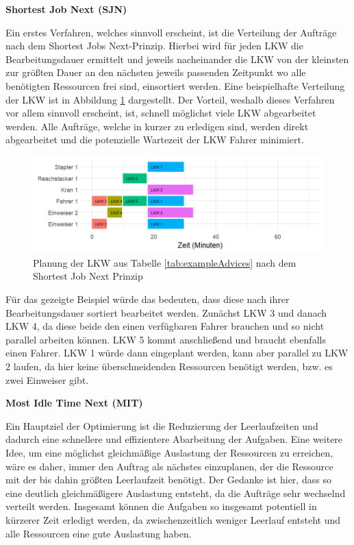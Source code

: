 \textbf{Shortest Job Next (SJN)}

Ein erstes Verfahren, welches sinnvoll erscheint, ist die Verteilung der Aufträge nach dem \glqq{}Shortest Jobs Next\grqq{}-Prinzip. Hierbei wird für jeden LKW die Bearbeitungsdauer ermittelt und jeweils nacheinander die LKW von der kleinsten zur größten Dauer an den nächsten jeweils passenden Zeitpunkt wo alle benötigten Ressourcen frei sind, einsortiert werden. Eine beispielhafte Verteilung der LKW ist in Abbildung \ref{fig:rsSjnExample} dargestellt. Der Vorteil, weshalb dieses Verfahren vor allem sinnvoll erscheint, ist, schnell möglichst viele LKW abgearbeitet werden. Alle Aufträge, welche in kurzer zu erledigen sind, werden direkt abgearbeitet und die potenzielle Wartezeit der LKW Fahrer minimiert.

\begin{figure}[H]
    \centering
    \includegraphics[width=\textwidth]{images/timelines/rsShortestJobNextExample.png}
    \caption{Planung der LKW aus Tabelle \ref{tab:exampleAdvices} nach dem Shortest Job Next Prinzip}
    \label{fig:rsSjnExample}
\end{figure}

Für das gezeigte Beispiel würde das bedeuten, dass diese nach ihrer Bearbeitungsdauer sortiert bearbeitet werden. Zunächst LKW 3 und danach LKW 4, da diese beide den einen verfügbaren Fahrer brauchen und so nicht parallel arbeiten können. LKW 5 kommt anschließend und braucht ebenfalls einen Fahrer. LKW 1 würde dann eingeplant werden, kann aber parallel zu LKW 2 laufen, da hier keine überschneidenden Ressourcen benötigt werden, bzw. es zwei Einweiser gibt.


\textbf{Most Idle Time Next (MIT)}

Ein Hauptziel der Optimierung ist die Reduzierung der Leerlaufzeiten und dadurch eine schnellere und effizientere Abarbeitung der Aufgaben. Eine weitere Idee, um eine möglichst gleichmäßige Auslastung der Ressourcen zu erreichen, wäre es daher, immer den Auftrag als nächstes einzuplanen, der die Ressource mit der bis dahin größten Leerlaufzeit benötigt. Der Gedanke ist hier, dass so eine deutlich gleichmäßigere Auslastung entsteht, da die Aufträge sehr wechselnd verteilt werden. Insgesamt können die Aufgaben so insgesamt potentiell in kürzerer Zeit erledigt werden, da zwischenzeitlich weniger Leerlauf entsteht und alle Ressourcen eine gute Auslastung haben.

